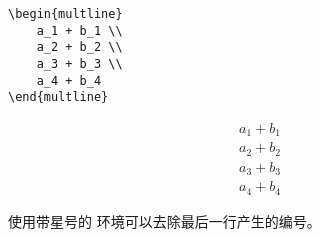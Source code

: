 \begin{enumerate}
\begin{tcolorbox}[sidebyside]
\begin{lstlisting}
\begin{multline} 
    a_1 + b_1 \\ 
    a_2 + b_2 \\ 
    a_3 + b_3 \\ 
    a_4 + b_4 
\end{multline}
\end{lstlisting} 

\tcblower

\begin{multline} a_1 + b_1 \\ 
    a_2 + b_2 \\ a_3 + b_3 \\ 
    a_4 + b_4 \end{multline}
\end{tcolorbox}

使用带星号的  环境可以去除最后一行产生的编号。


\end{enumerate}